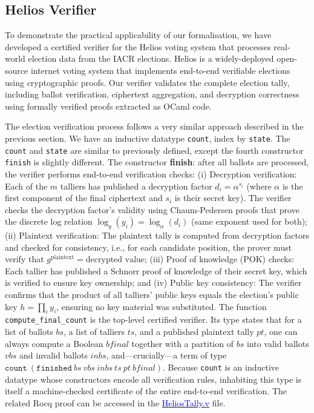 \documentclass[sigconf,anonymous,review]{acmart}
\begin{document}
\subsection{Helios Verifier}
To demonstrate the practical applicability of our formalisation, we have developed a certified verifier for 
the Helios voting system that processes real-world election data from the IACR elections. Helios is a 
widely-deployed open-source internet voting system that implements end-to-end verifiable elections using 
cryptographic proofs. Our verifier validates the complete election tally, including ballot verification, ciphertext aggregation, and decryption correctness using formally verified proofs 
extracted as OCaml code. 

The election verification process follows a very similar approach described in the 
previous section. We have an inductive datatype \texttt{count}, index by \texttt{state}. 
The \texttt{count} and \texttt{state} are similar to previously defined, except the fourth constructor \texttt{finish} is 
slightly different. The constructor \textbf{finish}: after all ballots are processed, the verifier performs end-to-end 
verification checks: (i) Decryption verification: Each of the $m$ talliers has published a decryption factor $d_i = \alpha^{s_i}$ 
(where $\alpha$ is the first component of the final ciphertext and $s_i$ is their secret key). The verifier 
checks the decryption factor's validity using Chaum-Pedersen proofs that prove the discrete log relation 
$\log_g(y_i) = \log_\alpha(d_i)$ (same exponent used for both); (ii) Plaintext verification: The plaintext tally is computed from decryption factors and checked for 
consistency, i.e., for each candidate position, the prover must verify that $g^{\text{plaintext}} = \text{decrypted value}$; (iii) Proof of knowledge (POK) checks: Each tallier has published a Schnorr proof of knowledge of their 
secret key, which is verified to ensure key ownership; and (iv) Public key consistency: The verifier confirms that the product of all talliers' public keys equals 
the election's public key $h = \prod_i y_i$, ensuring no key material was substituted.  The function \texttt{compute\_final\_count} is the top-level certified
verifier. Its type states that for a list of ballots $\mathit{bs}$,
a list of talliers $\mathit{ts}$, and a published plaintext
tally $\mathit{pt}$, one can always compute a Boolean $\mathit{bfinal}$ together
with a partition of $\mathit{bs}$ into valid ballots $\mathit{vbs}$ and invalid
ballots $\mathit{inbs}$, and---crucially---a term of type
$\texttt{count}~(\texttt{finished}~\mathit{bs}~\mathit{vbs}~\mathit{inbs}~\mathit{ts}~\mathit{pt}~\mathit{bfinal})$.
Because \texttt{count} is an inductive datatype whose constructors encode all
verification rules, inhabiting this type is itself a machine-checked
certificate of the entire end-to-end verification. The related Rocq proof can be accessed in the \href{https://anonymous.4open.science/r/SigmaProtocol-EBA5/src/Backend/HeliosTally.v}{\textcolor{blue}{HeliosTally.v}} file.
\end{document}
